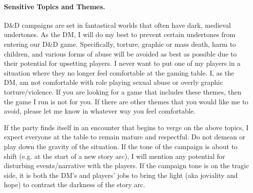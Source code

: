 \documentclass[12pt]{article}
\begin{document}
\paragraph{Sensitive Topics and Themes.}
\textsf{D\&D campaigns are set in fantastical worlds that often have dark, medieval undertones. As the DM, I will do my best to prevent certain undertones from entering our D\&D game. Specifically, torture, graphic or mass death, harm to children, and various forms of abuse will be avoided as best as possible due to their potential for upsetting players. I never want to put one of my players in a situation where they no longer feel comfortable at the gaming table. I, as the DM, am not comfortable with role playing sexual abuse or overly graphic torture/violence. If you are looking for a game that includes these themes, then the game I run is not for you. If there are other themes that you would like me to avoid, please let me know in whatever way you feel comfortable.}

\textsf{If the party finds itself in an encounter that begins to verge on the above topics, I expect everyone at the table to remain mature and respectful. Do not demean or play down the gravity of the situation. If the tone of the campaign is about to shift (e.g. at the start of a new story arc), I will mention any potential for disturbing events/narrative with the players. If the campaign tone is on the tragic side, it is both the DM's and players' jobs to bring the light (aka joviality and hope) to contrast the darkness of the story arc.}
\end{document}
